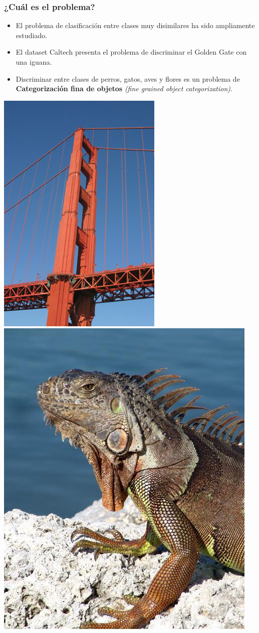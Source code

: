 \documentclass{beamer}
\begin{document}
	\begin{frame}
		\frametitle{¿Cuál es el problema?}
		\begin{itemize}
			\item{
				El problema de clasificación entre clases muy disimilares ha sido ampliamente estudiado.
			}
			\item{
				El dataset Caltech presenta el problema de discriminar el Golden Gate con una iguana.
			}
			\item{
				Discriminar entre clases de perros, gatos, aves y flores es un problema de \textbf{Categorización fina de objetos} \textit{(fine  grained  object  categorization)}.
			}
		\end{itemize}
		\centering
		{\includegraphics[scale=0.2]{imagen/ggate.jpg}}
		{\includegraphics[scale=0.14]{imagen/iguana.jpg}}

\end{frame}
\end{document}
